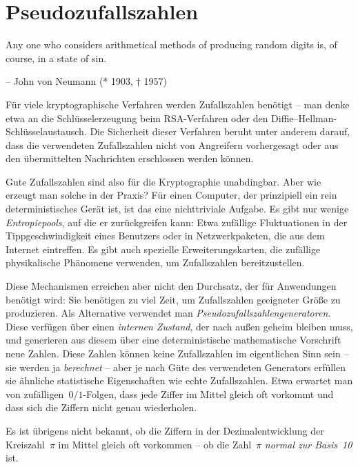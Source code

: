 \documentclass{../zirkelblatt}
\newcommand{\head}[1]{\section*{\rmfamily #1}}%
\begin{document}
\head{Pseudozufallszahlen}

\begin{trivlist}\setlength\leftskip{3cm}\setlength\rightskip{0pt}\item
Any one who considers arithmetical methods of producing random digits is, of
course, in a state of sin.

-- John von Neumann (* 1903, † 1957)
\end{trivlist}

Für viele kryptographische Verfahren werden Zufallszahlen benötigt -- man denke
etwa an die Schlüsselerzeugung beim RSA-Verfahren oder den
Diffie--Hellman-Schlüsselaustausch. Die Sicherheit dieser Verfahren beruht
unter anderem darauf, dass die verwendeten Zufallszahlen nicht von Angreifern
vorhergesagt oder aus den übermittelten Nachrichten erschlossen werden können.

Gute Zufallszahlen sind also für die Kryptographie unabdingbar. Aber wie
erzeugt man solche in der Praxis? Für einen Computer, der prinzipiell ein rein
deterministisches Gerät ist, ist das eine nichttriviale Aufgabe. Es gibt nur
wenige \emph{Entropiepools}, auf die er zurückgreifen kann: Etwa zufällige
Fluktuationen in der Tippgeschwindigkeit eines Benutzers oder in
Netzwerkpaketen, die aus dem Internet eintreffen. Es gibt auch spezielle
Erweiterungskarten, die zufällige physikalische Phänomene verwenden, um
Zufallszahlen bereitzustellen.

Diese Mechanismen erreichen aber nicht den Durchsatz, der für Anwendungen
benötigt wird: Sie benötigen zu viel Zeit, um Zufallszahlen geeigneter Größe zu
produzieren. Als Alternative verwendet man
\emph{Pseudozufallszahlengeneratoren}. Diese verfügen über einen \emph{internen
Zustand}, der nach außen geheim bleiben muss, und generieren aus diesem über
eine deterministische mathematische Vorschrift neue Zahlen. Diese Zahlen können
keine Zufallszahlen im eigentlichen Sinn sein -- sie werden ja \emph{berechnet}
-- aber je nach Güte des verwendeten Generators erfüllen sie ähnliche
statistische Eigenschaften wie echte Zufallszahlen.
Etwa erwartet man von zufälligen~$0/1$-Folgen, dass jede Ziffer im Mittel
gleich oft vorkommt und dass sich die Ziffern nicht genau wiederholen.

Es ist übrigens nicht bekannt, ob die Ziffern in der Dezimalentwicklung der
Kreiszahl~$\pi$ im Mittel gleich oft vorkommen -- ob die Zahl~$\pi$
\emph{normal zur Basis~10} ist.
\end{document}
